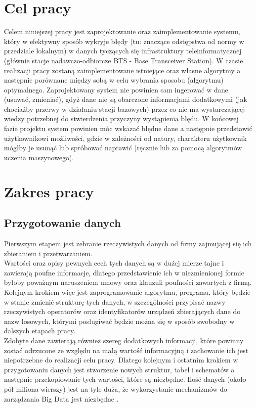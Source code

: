\documentclass[eng,printmode]{mgr}
\begin{document}
\section{Cel pracy}
Celem niniejszej pracy jest zaprojektowanie oraz zaimplementowanie systemu, który w efektywny sposób wykryje błędy (tu: znaczące odstępstwa od normy w przedziale lokalnym) w danych tyczących się infrastruktury teleinformatycznej (głównie stacje nadawczo-odbiorcze BTS - Base Transceiver Station). W czasie realizacji pracy zostaną zaimplementowane istniejące oraz własne algorytmy a następnie porównane między sobą w celu wybrania sposobu (algorytmu) optymalnego. Zaprojektowany system nie powinien sam ingerować w dane (usuwać, zmieniać), gdyż dane nie są obarczone informacjami dodatkowymi (jak chociażby przerwy w działaniu stacji bazowych) przez co nie ma wystarczającej wiedzy potrzebnej do stwierdzenia przyczyny wystąpienia błędu. W końcowej fazie projektu system powinien móc wskazać błędne dane a następnie przedstawić użytkownikowi możliwości, gdzie w zależności od natury, charakteru użytkownik mógłby je usunąć lub spróbować naprawić (ręcznie lub za pomocą algorytmów uczenia maszynowego). 

\section{Zakres pracy}
\subsection{Przygotowanie danych}
Pierwszym etapem jest zebranie rzeczywistych danych od firmy zajmującej się ich zbieraniem i przetwarzaniem.  \\
Wartości oraz opisy pewnych cech tych danych są w dużej mierze tajne i zawierają poufne informacje, dlatego przedstawienie ich w niezmienionej formie byłoby poważnym naruszeniem umowy oraz klauzuli poufności zawartych z firmą. \\
Kolejnym krokiem więc jest zaprogramowanie algorytmu, programu, który będzie w stanie zmienić strukturę tych danych, w szczególności przypisać nazwy rzeczywistych operatorów oraz identyfikatorów urządzeń zbierających dane do nazw losowych, którymi posługiwać będzie można się w sposób swobodny w dalszych etapach pracy. \\
Zdobyte dane zawierają również szereg dodatkowych informacji, które powinny zostać odrzucone ze względu na małą wartość informacyjną i zachowanie ich jest niepotrzebne do realizacji celu pracy. Dlatego kolejnym i ostatnim krokiem w przygotowaniu danych jest stworzenie nowych struktur, tabel i schematów a następnie przekopiowanie tych wartości, które są niezbędne. Ilość danych (około pół miliona wierszy) jest na tyle duża, że wykorzystanie mechanizmów do zarządzania Big Data jest niezbędne \cite{cassandra}\cite {cassandra-driver}.
\end{document}
